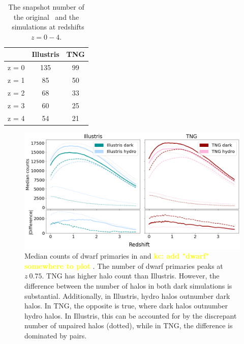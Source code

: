 \documentclass[twocolumn]{aastex631}
\newcommand{\kc}[1]{\textcolor{yellow}{\textbf{kc: #1}} }
\begin{document}
\begin{table}[]
  \centering
  \begin{tabular}{l|cc}
    \hline \hline
   & Illustris & TNG  \\ 
  \hline
  z = 0   &   135  &   99   \\
  z = 1   &   85   &   50   \\
  z = 2   &   68   &   33   \\
  z = 3   &   60   &   25   \\
  z = 4   &   54   &   21   \\
  \hline \hline
  \end{tabular}
  \caption{\label{tab:equiv-snapshot} The snapshot number of the original \ill\ and the \tng\ simulations at redshifts $z=0-4$.}
    \end{table}


\begin{figure}[htb]
  \centering
  \includegraphics[width=\textwidth]{counts_dwarfs.png}
  \caption{Median counts of dwarf primaries in \ill{} and \tng{} \kc{add "dwarf" somewhere to plot}. The number of dwarf primaries peaks at $z~0.75$. TNG has higher halo count than Illustris. However, the difference between the number of halos in both dark simulations is substantial. Additionally, in Illustris, hydro halos outnumber dark halos. In TNG, the opposite is true, where dark halos outnumber hydro halos. In Illustris, this can be accounted for by the discrepant number of unpaired halos (dotted), while in TNG, the difference is dominated by pairs. 
    }
  \label{fig:counts-dwarfs}
\end{figure}
\end{document}
